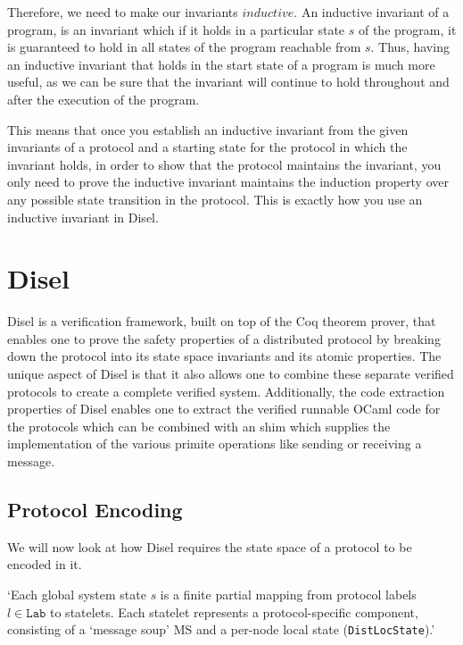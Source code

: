 Therefore, we need to make our invariants $inductive$. An inductive invariant
of a program, is an invariant which if it holds in a particular state $s$ of the
program, it is guaranteed to hold in all states of the program reachable from $s$.
Thus, having an inductive invariant that holds in the start state of a program
is much more useful, as we can be sure that the invariant will continue to
hold throughout and after the execution of the program.

This means that once you establish an inductive invariant from the given invariants
of a protocol and a starting state for the protocol in which the invariant holds,
in order to show that the protocol maintains the invariant, you only need to
prove the inductive invariant maintains the induction property over any possible state
transition in the protocol. This is exactly how you use an inductive invariant in
Disel.


\section{Disel}
Disel \cite{9} is a verification framework, built on top of the Coq theorem prover,
that enables one to prove the safety properties of a distributed protocol by
breaking down the protocol into its state space invariants and its atomic properties.
The unique aspect of Disel is that it also allows one to combine these separate
verified protocols to create a complete verified system. Additionally, the
code extraction properties of Disel enables one to extract the verified runnable
OCaml code for the protocols which can be combined with an shim which supplies
the implementation of the various primite operations like sending or receiving
a message.

\subsection{Protocol Encoding}
We will now look at how Disel requires the state space of a protocol to be encoded in it.

`Each global system state $s$ is a finite partial mapping from protocol labels
$l \in \mathrm{\texttt{Lab}}$ to statelets. Each statelet represents a
protocol-specific component, consisting of a `message soup' MS and a per-node
local state (\texttt{DistLocState}).'


